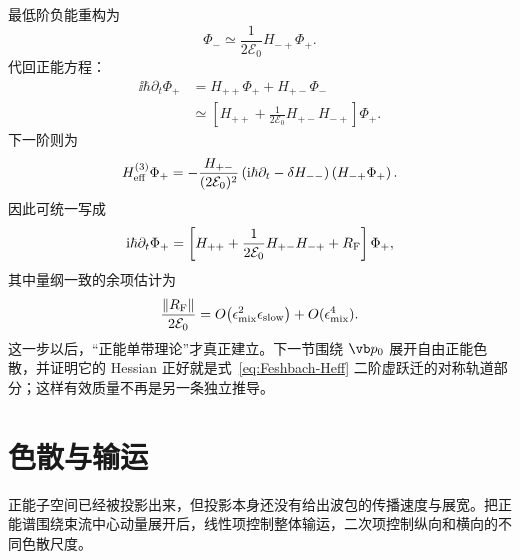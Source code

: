 最低阶负能重构为
\begin{equation}
 {
 \Phi_-\simeq\frac{1}{2\mathcal E_0}H_{-+}\Phi_+.}
 \label{eq:Feshbach-negative-leading}
\end{equation}
代回正能方程：
\begin{align}
\ii\hbar\partial_t\Phi_+
&=H_{++}\Phi_+ +H_{+-}\Phi_-\\
&\simeq
\left[H_{++}+\frac{1}{2\mathcal E_0}H_{+-}H_{-+}\right]\Phi_+.
\end{align}
下一阶则为
\begin{equation}
H_{\rm eff}^{(3)}\Phi_+
=-\frac{H_{+-}}{(2\mathcal E_0)^2}
\left(\mathrm{i}\hbar\partial_t-\delta H_{--}\right)
\left(H_{-+}\Phi_+\right).
\label{eq:Feshbach-Heff-next}
\end{equation}
因此可统一写成
\begin{equation}
 {
 \mathrm{i}\hbar\partial_t\Phi_+
 =\left[
 H_{++}
 +\frac{1}{2\mathcal E_0}H_{+-}H_{-+}
 +R_{\rm F}
 \right]\Phi_+,}
 \label{eq:Feshbach-Heff}
\end{equation}
其中量纲一致的余项估计为
\begin{equation}
 {
 \frac{\|R_{\rm F}\|}{2\mathcal E_0}
 =O\!\left(\epsilon_{\rm mix}^2\epsilon_{\rm slow}\right)
 +O(\epsilon_{\rm mix}^4).}
 \label{eq:Feshbach-remainder-estimate}
\end{equation}
这一步以后，“正能单带理论”才真正建立。下一节围绕 $\vb p_0$ 展开自由正能色散，并证明它的 Hessian 正好就是式~\cref{eq:Feshbach-Heff} 二阶虚跃迁的对称轨道部分；这样有效质量不再是另一条独立推导。


\section{色散与输运}
正能子空间已经被投影出来，但投影本身还没有给出波包的传播速度与展宽。把正能谱围绕束流中心动量展开后，线性项控制整体输运，二次项控制纵向和横向的不同色散尺度。


